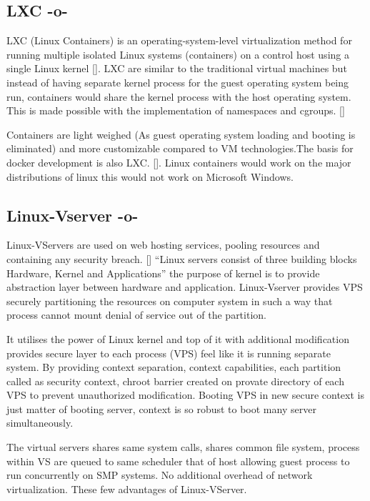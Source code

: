 \subsection{LXC -o-}
     
LXC (Linux Containers) is an operating-system-level virtualization
method for running multiple isolated Linux systems (containers) on a
control host using a single Linux kernel [\cite{www-wiki-lxc}]. LXC are
similar to the traditional virtual machines but instead of having
separate kernel process for the guest operating system being run,
containers would share the kernel process with the host operating
system. This is made possible with the implementation of namespaces
and cgroups. [\cite{www-jpablo}]

Containers are light weighed (As guest operating system loading and
booting is eliminated) and more customizable compared to VM
technologies.The basis for docker development is also
LXC. [\cite{www-infoworld}]. Linux containers would work on the major
distributions of linux this would not work on Microsoft Windows.
  
\subsection{Linux-Vserver -o-}

Linux-VServers are used on web hosting services, pooling resources and
containing any security breach. [\cite{www-linux-vserver-org}] ``Linux
servers consist of three building blocks Hardware, Kernel and
Applications'' the purpose of kernel is to provide abstraction layer
between hardware and application. Linux-Vserver provides VPS securely
partitioning the resources on computer system in such a way that
process cannot mount denial of service out of the partition.
     
It utilises the power of Linux kernel and top of it with additional
modification provides secure layer to each process (VPS) feel like it
is running separate system.  By providing context separation, context
capabilities, each partition called as security context, chroot
barrier created on provate directory of each VPS to prevent
unauthorized modification. Booting VPS in new secure context is just
matter of booting server, context is so robust to boot many server
simultaneously.
     
The virtual servers shares same system calls, shares common file
system, process within VS are queued to same scheduler that of host
allowing guest process to run concurrently on SMP systems. No
additional overhead of network virtualization.  These few advantages
of Linux-VServer.

